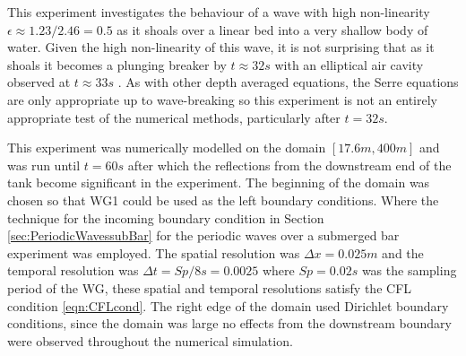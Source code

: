 This experiment investigates the behaviour of a wave with high non-linearity $ \epsilon \approx 1.23/2.46 = 0.5$ as it shoals over a linear bed into a very shallow body of water. Given the high non-linearity of this wave, it is not surprising that as it shoals it becomes a plunging breaker by $t \approx 32s$ with an elliptical air cavity observed at $t \approx 33s$ \cite{Roeber-2010}. As with other depth averaged equations, the Serre equations are only appropriate up to wave-breaking so this experiment is not an entirely appropriate test of the numerical methods, particularly after $t=32s$.

This experiment was numerically modelled on the domain $[17.6m , 400m]$ and was run until $t = 60s$ after which the reflections from the downstream end of the tank become significant in the experiment. The beginning of the domain was chosen so that WG1 could be used as the left boundary conditions. Where the technique for the incoming boundary condition in Section \ref{sec:PeriodicWavessubBar} for the periodic waves over a submerged bar experiment was employed. The spatial resolution was $\Delta x = 0.025m$ and the temporal resolution was $\Delta t = Sp / 8 s = 0.0025$ where $Sp = 0.02s$ was the sampling period of the WG, these spatial and temporal resolutions satisfy the CFL condition \eqref{eqn:CFLcond}. The right edge of the domain used Dirichlet boundary conditions, since the domain was large no effects from the downstream boundary were observed throughout the numerical simulation. 

